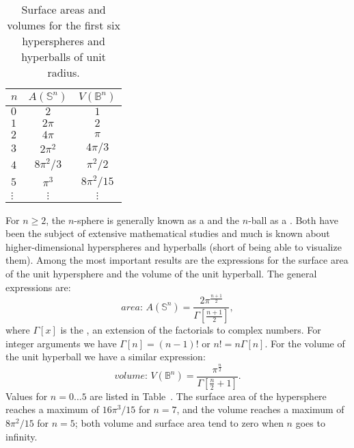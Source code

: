 \begin{table}[t]
\leavevmode\centering
\begin{tabular}{|l|c|c|}
\hline
$n$ & $A(\mathbb{S}^n)$ & $V(\mathbb{B}^n)$ \\
\hline\hline
$0$ & $2$ & $1$ \\ 
$1$ & $2\pi$ & $2$ \\
$2$ & $4\pi$ & $\pi$ \\
$3$ & $2\pi^2$ & $4\pi/3$ \\
$4$ & $8\pi^2/3$ & $\pi^2/2$ \\
$5$ & $\pi^3$ & $8\pi^2/15$ \\
$\vdots$ & $\vdots$ & $\vdots$\\
\hline
\end{tabular}
\caption{Surface areas and volumes for the first six hyperspheres and hyperballs of unit radius.}
\end{table}

For $n\ge 2$, the $n$-sphere is generally known as a  and the $n$-ball as a .  Both have been the subject of extensive mathematical studies and much is known about higher-dimensional hyperspheres and hyperballs (short of being able to visualize them).  Among the most important results are the expressions for the surface area of the unit hypersphere and the volume of the unit hyperball.  The general expressions are:
\begin{equation}
	\textit{area: }A(\mathbb{S}^n) = \frac{2\pi^{\frac{n+1}{2}}}{\Gamma[\frac{n+1}{2}]},
\end{equation}
where $\Gamma[x]$ is the , an extension of the factorials to complex numbers.  For integer arguments we have $\Gamma[n]=(n-1)!$ or $n!=n\Gamma[n]$.  For the volume of the unit hyperball we have a similar expression:
\begin{equation}
	\textit{volume: }V(\mathbb{B}^n) = \frac{\pi^{\frac{n}{2}}}{\Gamma[\frac{n}{2}+1]}.
\end{equation}
Values for $n=0\ldots 5$ are listed in Table~.  The surface area of the hypersphere reaches a maximum of $16\pi^3/15$ for $n=7$, and the volume reaches a maximum of $8\pi^2/15$ for $n=5$; both volume and surface area tend to zero when $n$ goes to infinity.


